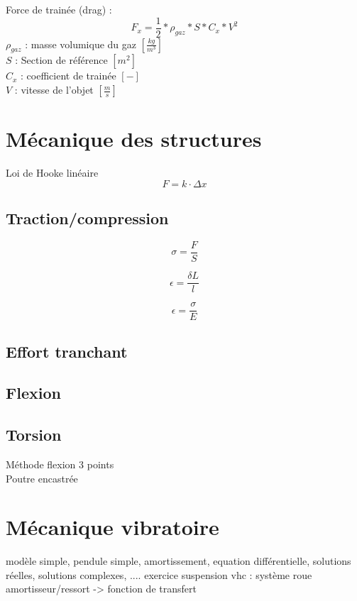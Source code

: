 \documentclass[12pt,a4paper,twoside]{article}
\numberwithin{equation}{subsection}
\begin{document}
Force de trainée (drag) :
\begin{equation}
F_x=\frac{1}{2}*\rho_{gaz}*S*C_x*V^2
\end{equation}
$\rho_{gaz}$ : masse volumique du gaz $[\frac{kg}{m^3}]$\\
$S$ : Section de référence $[m^2]$\\
$C_x$ : coefficient de trainée $[-]$\\
$V$ : vitesse de l'objet $[\frac{m}{s}]$\\


\newpage
\section{Mécanique des structures}

Loi de Hooke linéaire
\begin{equation}
F=k\cdot \Delta x
\end{equation}

\subsection{Traction/compression}
\begin{equation}
\sigma=\frac{F}{S}
\end{equation}

\begin{equation}
\epsilon=\frac{\delta L}{l}
\end{equation}

\begin{equation}
\epsilon=\frac{\sigma}{E}
\end{equation}

\subsection{Effort tranchant}
\subsection{Flexion}

\subsection{Torsion}

Méthode flexion 3 points\\
Poutre encastrée


\newpage
\section{Mécanique vibratoire}
modèle simple, pendule simple, amortissement, equation différentielle, solutions réelles, solutions complexes, ....
exercice suspension vhc : système roue amortisseur/ressort -> fonction de transfert
\end{document}
